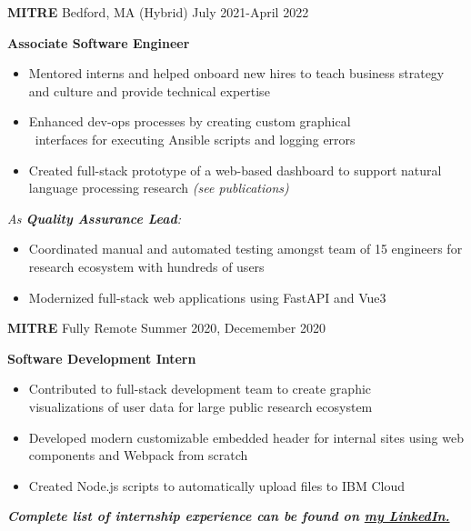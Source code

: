 \documentclass[10pt,a4paper,ragged2e,withhyper]{altacv}
\begin{document}
\begin{paracol}{2}
\large\color{emphasis}\textbf{MITRE} \small\faSuitcase Bedford, MA (Hybrid)
\hfill\small\faCalendar July 2021-April 2022\par
\textbf{\color{subheading}Associate Software Engineer}\par
\smallskip
\normalsize
\begin{itemize}
\item Mentored interns and helped onboard new hires to teach business strategy and culture and provide technical expertise
\item Enhanced dev-ops processes by creating custom graphical \\\ interfaces for executing Ansible scripts and logging errors
\item Created full-stack prototype of a web-based dashboard to support natural language processing research \textit{(see publications)}
\end{itemize}
\smallskip
\textit{As \textbf{Quality Assurance Lead}:}
\begin{itemize}
\item Coordinated manual and automated testing amongst team of 15 engineers for research ecosystem with hundreds of users
\item Modernized full-stack web applications using FastAPI and Vue3
\end{itemize}
\divider

\large\color{emphasis}\textbf{MITRE} \small\faDesktop Fully Remote
\hfill\small\faCalendar Summer 2020, Decemember 2020\par
\textbf{\color{subheading}Software Development Intern}\par
\smallskip
\normalsize
\begin{itemize}
\item Contributed to full-stack development team to create graphic \\ visualizations of user data for large public research ecosystem
\item Developed modern customizable embedded header for internal sites using web components and Webpack from scratch
\item Created Node.js scripts to automatically upload files to IBM Cloud
\end{itemize}

\begin{center}
\textbf{\textit{Complete list of internship experience can be found on \href{https://linkedin.com/in/james-d-tanner}{my LinkedIn.}}}
\end{center}


\end{paracol}
\end{document}
